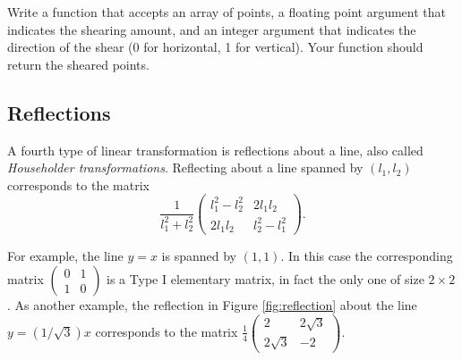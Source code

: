 \begin{problem}
Write a function that accepts an array of points, a floating point argument that indicates the shearing amount, and an integer argument that indicates the direction of the shear (0 for horizontal, 1 for vertical).
Your function should return the sheared points.
\end{problem}

\subsection*{Reflections}%

A fourth type of linear transformation is reflections about a line, also called \emph{Householder transformations}.
Reflecting about a line spanned by $(l_1, l_2)$ corresponds to the matrix
\[
\frac{1}{l_1^2 + l_2^2}
\begin{pmatrix}
l_1^2 - l_2^2 & 2l_1l_2 \\
2l_1l_2 & l_2^2 - l_1^2
\end{pmatrix}.
\]

For example, the line $y=x$ is spanned by $(1, 1)$.
In this case the corresponding matrix $\begin{pmatrix}
0 & 1\\
1 & 0
\end{pmatrix}$ is a Type I elementary matrix, in fact the only one of size $2 \times 2$.
As another example, the reflection in Figure \ref{fig:reflection} about the line $y = (1/\sqrt{3})x$ corresponds to the matrix $\frac{1}{4}\begin{pmatrix}
2 & 2\sqrt{3}\\
2\sqrt{3} & -2
\end{pmatrix}$.

